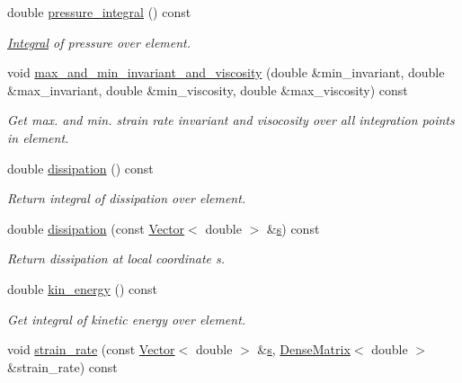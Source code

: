 \begin{DoxyCompactItemize}
double \hyperlink{classoomph_1_1GeneralisedNewtonianAxisymmetricNavierStokesEquations_a442eef3d09781315e5129d33c549c2b8}{pressure\+\_\+integral} () const
\begin{DoxyCompactList}\small\item\em \hyperlink{classoomph_1_1Integral}{Integral} of pressure over element. \end{DoxyCompactList}\item 
void \hyperlink{classoomph_1_1GeneralisedNewtonianAxisymmetricNavierStokesEquations_a4cc3e552f2a75866223e0da322d243b1}{max\+\_\+and\+\_\+min\+\_\+invariant\+\_\+and\+\_\+viscosity} (double \&min\+\_\+invariant, double \&max\+\_\+invariant, double \&min\+\_\+viscosity, double \&max\+\_\+viscosity) const
\begin{DoxyCompactList}\small\item\em Get max. and min. strain rate invariant and visocosity over all integration points in element. \end{DoxyCompactList}\item 
double \hyperlink{classoomph_1_1GeneralisedNewtonianAxisymmetricNavierStokesEquations_a26ea3dbfc01a10f5cfe56d719dba8255}{dissipation} () const
\begin{DoxyCompactList}\small\item\em Return integral of dissipation over element. \end{DoxyCompactList}\item 
double \hyperlink{classoomph_1_1GeneralisedNewtonianAxisymmetricNavierStokesEquations_a89b1f239f7a2fdd40fa64926bb1e0e5f}{dissipation} (const \hyperlink{classoomph_1_1Vector}{Vector}$<$ double $>$ \&\hyperlink{cfortran_8h_ab7123126e4885ef647dd9c6e3807a21c}{s}) const
\begin{DoxyCompactList}\small\item\em Return dissipation at local coordinate s. \end{DoxyCompactList}\item 
double \hyperlink{classoomph_1_1GeneralisedNewtonianAxisymmetricNavierStokesEquations_a3abef1d397b5d9a789d6ac3da1423588}{kin\+\_\+energy} () const
\begin{DoxyCompactList}\small\item\em Get integral of kinetic energy over element. \end{DoxyCompactList}\item 
void \hyperlink{classoomph_1_1GeneralisedNewtonianAxisymmetricNavierStokesEquations_af8f4209f5073bcd5cb50901711fbbdbc}{strain\+\_\+rate} (const \hyperlink{classoomph_1_1Vector}{Vector}$<$ double $>$ \&\hyperlink{cfortran_8h_ab7123126e4885ef647dd9c6e3807a21c}{s}, \hyperlink{classoomph_1_1DenseMatrix}{Dense\+Matrix}$<$ double $>$ \&strain\+\_\+rate) const

\end{DoxyCompactItemize}

